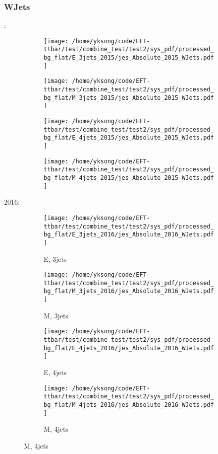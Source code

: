 \documentclass{beamer}
\begin{document}
\begin{frame}
\frametitle{WJets}
\fontsize{5}{1}:
\begin{figure}
\centering
\begin{subfigure}[b]{0.24\textwidth}
\texttt{[image: /home/yksong/code/EFT-ttbar/test/combine\_test/test2/sys\_pdf/processed\_bg\_flat/E\_3jets\_2015/jes\_Absolute\_2015\_WJets.pdf]}
\end{subfigure}
\begin{subfigure}[b]{0.24\textwidth}
\texttt{[image: /home/yksong/code/EFT-ttbar/test/combine\_test/test2/sys\_pdf/processed\_bg\_flat/M\_3jets\_2015/jes\_Absolute\_2015\_WJets.pdf]}
\end{subfigure}
\begin{subfigure}[b]{0.24\textwidth}
\texttt{[image: /home/yksong/code/EFT-ttbar/test/combine\_test/test2/sys\_pdf/processed\_bg\_flat/E\_4jets\_2015/jes\_Absolute\_2015\_WJets.pdf]}
\end{subfigure}
\begin{subfigure}[b]{0.24\textwidth}
\texttt{[image: /home/yksong/code/EFT-ttbar/test/combine\_test/test2/sys\_pdf/processed\_bg\_flat/M\_4jets\_2015/jes\_Absolute\_2015\_WJets.pdf]}
\end{subfigure}
\end{figure}
2016:
\begin{figure}
\centering
\begin{subfigure}[b]{0.24\textwidth}
\texttt{[image: /home/yksong/code/EFT-ttbar/test/combine\_test/test2/sys\_pdf/processed\_bg\_flat/E\_3jets\_2016/jes\_Absolute\_2016\_WJets.pdf]}
\captionsetup{font=tiny}
\caption{E, 3jets}
\end{subfigure}
\begin{subfigure}[b]{0.24\textwidth}
\texttt{[image: /home/yksong/code/EFT-ttbar/test/combine\_test/test2/sys\_pdf/processed\_bg\_flat/M\_3jets\_2016/jes\_Absolute\_2016\_WJets.pdf]}
\captionsetup{font=tiny}
\caption{M, 3jets}
\end{subfigure}
\begin{subfigure}[b]{0.24\textwidth}
\texttt{[image: /home/yksong/code/EFT-ttbar/test/combine\_test/test2/sys\_pdf/processed\_bg\_flat/E\_4jets\_2016/jes\_Absolute\_2016\_WJets.pdf]}
\captionsetup{font=tiny}
\caption{E, 4jets}
\end{subfigure}
\begin{subfigure}[b]{0.24\textwidth}
\texttt{[image: /home/yksong/code/EFT-ttbar/test/combine\_test/test2/sys\_pdf/processed\_bg\_flat/M\_4jets\_2016/jes\_Absolute\_2016\_WJets.pdf]}
\captionsetup{font=tiny}
\caption{M, 4jets}
\end{subfigure}
\end{figure}
\end{frame}
\end{document}
